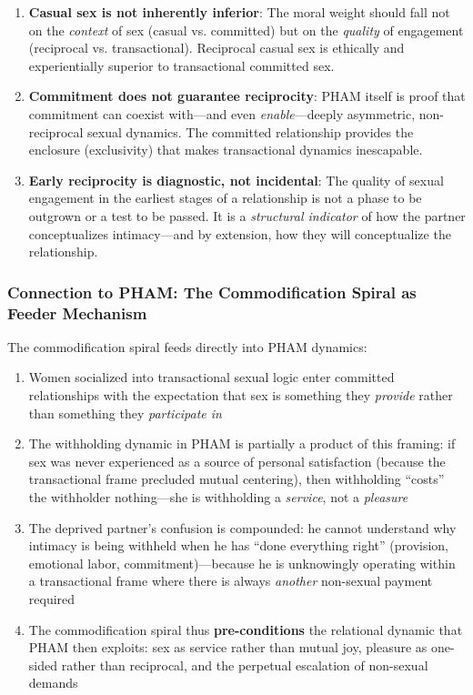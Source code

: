\documentclass[12pt, letterpaper]{article}
\begin{document}
\begin{enumerate}
    \item \textbf{Casual sex is not inherently inferior}: The moral weight should fall not on the \textit{context} of sex (casual vs. committed) but on the \textit{quality} of engagement (reciprocal vs. transactional). Reciprocal casual sex is ethically and experientially superior to transactional committed sex.
    
    \item \textbf{Commitment does not guarantee reciprocity}: PHAM itself is proof that commitment can coexist with---and even \textit{enable}---deeply asymmetric, non-reciprocal sexual dynamics. The committed relationship provides the enclosure (exclusivity) that makes transactional dynamics inescapable.
    
    \item \textbf{Early reciprocity is diagnostic, not incidental}: The quality of sexual engagement in the earliest stages of a relationship is not a phase to be outgrown or a test to be passed. It is a \textit{structural indicator} of how the partner conceptualizes intimacy---and by extension, how they will conceptualize the relationship.
\end{enumerate}

\subsubsection{Connection to PHAM: The Commodification Spiral as Feeder Mechanism}

The commodification spiral feeds directly into PHAM dynamics:

\begin{enumerate}
    \item Women socialized into transactional sexual logic enter committed relationships with the expectation that sex is something they \textit{provide} rather than something they \textit{participate in}
    \item The withholding dynamic in PHAM is partially a product of this framing: if sex was never experienced as a source of personal satisfaction (because the transactional frame precluded mutual centering), then withholding ``costs'' the withholder nothing---she is withholding a \textit{service}, not a \textit{pleasure}
    \item The deprived partner's confusion is compounded: he cannot understand why intimacy is being withheld when he has ``done everything right'' (provision, emotional labor, commitment)---because he is unknowingly operating within a transactional frame where there is always \textit{another} non-sexual payment required
    \item The commodification spiral thus \textbf{pre-conditions} the relational dynamic that PHAM then exploits: sex as service rather than mutual joy, pleasure as one-sided rather than reciprocal, and the perpetual escalation of non-sexual demands
\end{enumerate}
\end{document}
